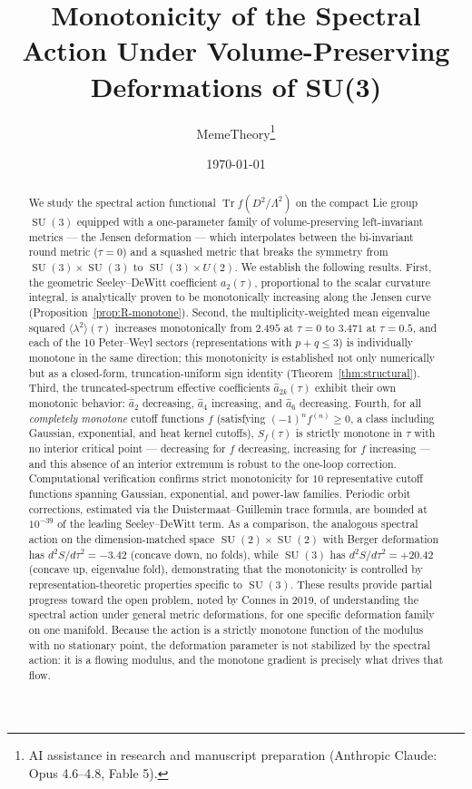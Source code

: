 \documentclass[12pt]{article}
\title{Monotonicity of the Spectral Action Under Volume-Preserving Deformations of SU(3)}
\author{MemeTheory\thanks{AI assistance in research and manuscript
  preparation (Anthropic Claude: Opus 4.6--4.8, Fable 5).}}
\date{\today}
\theoremstyle{definition}
\theoremstyle{remark}
\DeclareMathOperator{\Tr}{Tr}
\DeclareMathOperator{\SU}{SU}
\begin{document}
\maketitle

\begin{abstract}
We study the spectral action functional $\Tr f(D^2/\Lambda^2)$ on the
compact Lie group $\SU(3)$ equipped with a one-parameter family of
volume-preserving left-invariant metrics --- the Jensen deformation ---
which interpolates between the bi-invariant round metric ($\tau=0$) and
a squashed metric that breaks the symmetry from $\SU(3)\times\SU(3)$
to $\SU(3)\times U(2)$.  We establish the following results.
First, the geometric Seeley--DeWitt coefficient $a_2(\tau)$,
proportional to the scalar curvature integral, is analytically proven
to be monotonically increasing along the Jensen curve
(Proposition~\ref{prop:R-monotone}).
Second, the multiplicity-weighted mean eigenvalue squared
$\langle\lambda^2\rangle(\tau)$ increases monotonically from $2.495$
at $\tau=0$ to $3.471$ at $\tau=0.5$, and each of the $10$
Peter--Weyl sectors (representations with $p+q\leq 3$) is
individually monotone in the same direction; this monotonicity is
established not only numerically but as a closed-form, truncation-uniform
sign identity (Theorem~\ref{thm:structural}).
Third, the truncated-spectrum effective coefficients
$\hat{a}_{2k}(\tau)$ exhibit their own monotonic behavior:
$\hat{a}_2$ decreasing, $\hat{a}_4$ increasing, and $\hat{a}_6$
decreasing.
Fourth, for all \emph{completely monotone} cutoff functions $f$
(satisfying $(-1)^n f^{(n)} \geq 0$, a class including Gaussian,
exponential, and heat kernel cutoffs), $S_f(\tau)$ is strictly
monotone in $\tau$ with no interior critical point --- decreasing for
$f$ decreasing, increasing for $f$ increasing --- and this
absence of an interior extremum is robust to the one-loop correction.
Computational verification confirms strict monotonicity for $10$
representative cutoff functions spanning Gaussian, exponential, and
power-law families.
Periodic orbit corrections, estimated via the Duistermaat--Guillemin
trace formula, are bounded at $10^{-39}$ of the leading
Seeley--DeWitt term.  As a comparison, the analogous spectral action
on the dimension-matched space $\SU(2)\times\SU(2)$ with Berger
deformation has $d^2S/d\tau^2 = -3.42$ (concave down, no folds),
while $\SU(3)$ has $d^2S/d\tau^2 = +20.42$ (concave up, eigenvalue
fold), demonstrating that the monotonicity is controlled by
representation-theoretic properties specific to $\SU(3)$.  These
results provide partial progress toward the open problem, noted by
Connes in 2019, of understanding the spectral action under general
metric deformations, for one specific deformation family on one
manifold.  Because the action is a strictly monotone function of the
modulus with no stationary point, the deformation parameter is not
stabilized by the spectral action: it is a flowing modulus, and the
monotone gradient is precisely what drives that flow.
\end{abstract}
\end{document}
